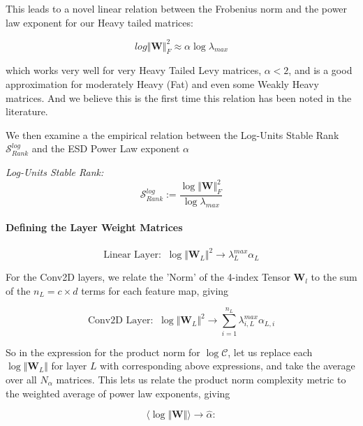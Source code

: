 This leads to a novel linear relation between the Frobenius norm and the power law exponent for our Heavy tailed matrices:

$$log\Vert\mathbf{W}\Vert^{2}_{F}\approx\alpha\log\lambda_{max}$$

which works very well for very Heavy Tailed Levy matrices, $\alpha<2$, and is a good approximation
for moderately Heavy (Fat) and even some Weakly Heavy matrices.  And we believe this is the first
time this relation has been noted in the literature.


We then examine a the empirical relation between  the Log-Units Stable Rank 
$\mathcal{S}^{log}_{Rank}$ and the ESD Power Law exponent $\alpha$

\emph{Log-Units Stable Rank:  } 
$$\mathcal{S}^{log}_{Rank}:=\dfrac{\log\Vert\mathbf{W}\Vert^{2}_{F}}{\log\lambda_{max}}$$




\paragraph{Defining the Layer Weight Matrices}

$$\text{Linear Layer:}\;\;\log\Vert\mathbf{W}_{L}\Vert^{2}\rightarrow\lambda^{max}_{L}\alpha_{L}$$

For the Conv2D layers, we relate the 'Norm' of the 4-index Tensor $\mathbf{W}_{l}$ to the sum of the $n_{L}=c\times d$ terms for each feature map, giving 

$$\text{Conv2D Layer:}\;\;\log\Vert\mathbf{W}_{L}\Vert^{2}\rightarrow \sum_{i=1}^{n_{L}}\lambda^{max}_{i,L}\alpha_{L,i}$$

So in the expression for the product norm for $\log\mathcal{C}$, let us replace each $\log\Vert\mathbf{W}_{L}\Vert$ for layer $L$ with corresponding above expressions, and take the average over all $N_{\alpha}$  matrices.  This lets us relate the product norm complexity metric to the weighted average of power law exponents, giving

$$\langle\log\Vert\mathbf{W}\Vert\rangle\rightarrow\hat{\alpha}:$$ 

